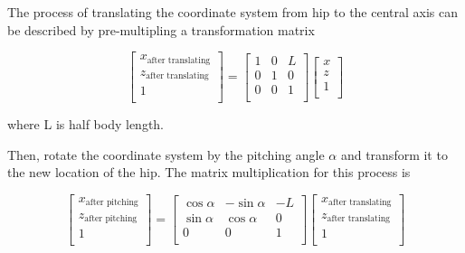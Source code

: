 
The process of translating the coordinate system from hip to the central axis can be described by pre-multipling a transformation matrix

\begin{equation}
   \begin{bmatrix}
   x_\text{after translating} \\
   z_\text{after translating} \\
   1                       \\
   \end{bmatrix}
   =
   \begin{bmatrix}
   1 & 0 & L \\
   0 & 1 & 0 \\
   0 & 0 & 1 \\
   \end{bmatrix}
   \begin{bmatrix}
   x \\
   z \\
   1 \\
   \end{bmatrix}
\end{equation}

where L is half body length.

Then, rotate the coordinate system by the pitching angle $\alpha$ and transform it to the new location of the hip. The matrix multiplication for this process is

\begin{equation}
   \begin{bmatrix}
   x_\text{after pitching} \\
   z_\text{after pitching} \\
   1                       \\
   \end{bmatrix}
   =
   \begin{bmatrix}
   \cos\alpha & -\sin\alpha & -L \\
   \sin\alpha & \cos\alpha & 0 \\
   0 & 0 & 1 \\
   \end{bmatrix}
   \begin{bmatrix}
   x_\text{after translating} \\
   z_\text{after translating} \\
   1                       \\
   \end{bmatrix}
\end{equation}

